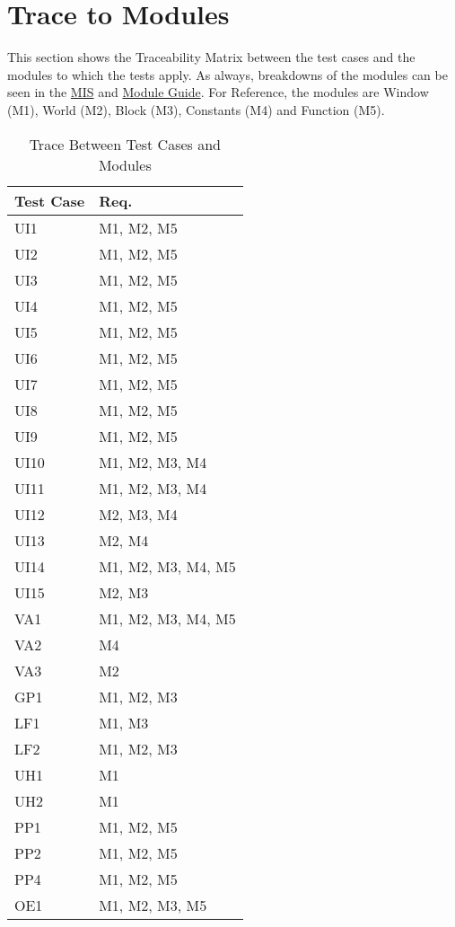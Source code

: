 \documentclass[12pt, titlepage]{article}
\begin{document}
\section{Trace to Modules}		
This section shows the Traceability Matrix between the test cases and the modules to which the tests apply. As always, breakdowns of the modules can be seen in the \href{https://gitlab.cas.mcmaster.ca/lucenta/3XA3/blob/master/Doc/Design/MIS/MIS.pdf}{MIS} and \href{https://gitlab.cas.mcmaster.ca/lucenta/3XA3/blob/master/Doc/Design/MG/MG.pdf}{Module Guide}.
For Reference, the modules are Window (M1), World (M2), Block (M3), Constants (M4) and Function (M5).
\begin{table}[H]
\centering
\begin{tabular}{p{} p{}}
\toprule
\textbf{Test Case} & \textbf{Req.}\\
\midrule
UI1 & M1, M2, M5 \\
UI2 & M1, M2, M5 \\
UI3 & M1, M2, M5 \\
UI4 & M1, M2, M5 \\
UI5 & M1, M2, M5 \\
UI6 & M1, M2, M5 \\
UI7 & M1, M2, M5 \\
UI8 & M1, M2, M5 \\
UI9 & M1, M2, M5 \\
UI10 & M1, M2, M3, M4 \\
UI11 & M1, M2, M3, M4 \\
UI12 & M2, M3, M4 \\
UI13 & M2, M4 \\
UI14 & M1, M2, M3, M4, M5 \\
UI15 & M2, M3 \\
VA1 & M1, M2, M3, M4, M5 \\
VA2 & M4 \\
VA3 & M2 \\
GP1 & M1, M2, M3 \\
LF1 & M1, M3 \\
LF2 & M1, M2, M3 \\
UH1 & M1 \\
UH2 & M1 \\
PP1 & M1, M2, M5 \\
PP2 & M1, M2, M5 \\
PP4 & M1, M2, M5 \\
OE1 & M1, M2, M3, M5 \\
\bottomrule
\end{tabular}
\caption{Trace Between Test Cases and Modules}
\label{TblRT}
\end{table}
\end{document}

